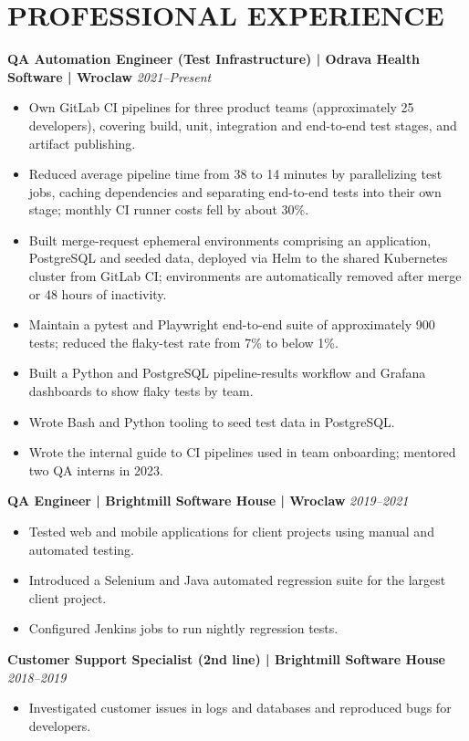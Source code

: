 \documentclass[11pt,a4paper]{article}
\begin{document}
\section*{PROFESSIONAL EXPERIENCE}
\textbf{QA Automation Engineer (Test Infrastructure) | Odrava Health Software | Wroclaw} \hfill \textit{2021–Present}
\begin{itemize}
\item Own GitLab CI pipelines for three product teams (approximately 25 developers), covering build, unit, integration and end-to-end test stages, and artifact publishing.
\item Reduced average pipeline time from 38 to 14 minutes by parallelizing test jobs, caching dependencies and separating end-to-end tests into their own stage; monthly CI runner costs fell by about 30\%.
\item Built merge-request ephemeral environments comprising an application, PostgreSQL and seeded data, deployed via Helm to the shared Kubernetes cluster from GitLab CI; environments are automatically removed after merge or 48 hours of inactivity.
\item Maintain a pytest and Playwright end-to-end suite of approximately 900 tests; reduced the flaky-test rate from 7\% to below 1\%.
\item Built a Python and PostgreSQL pipeline-results workflow and Grafana dashboards to show flaky tests by team.
\item Wrote Bash and Python tooling to seed test data in PostgreSQL.
\item Wrote the internal guide to CI pipelines used in team onboarding; mentored two QA interns in 2023.
\end{itemize}

\textbf{QA Engineer | Brightmill Software House | Wroclaw} \hfill \textit{2019–2021}
\begin{itemize}
\item Tested web and mobile applications for client projects using manual and automated testing.
\item Introduced a Selenium and Java automated regression suite for the largest client project.
\item Configured Jenkins jobs to run nightly regression tests.
\end{itemize}

\textbf{Customer Support Specialist (2nd line) | Brightmill Software House} \hfill \textit{2018–2019}
\begin{itemize}
\item Investigated customer issues in logs and databases and reproduced bugs for developers.
\end{itemize}
\end{document}
